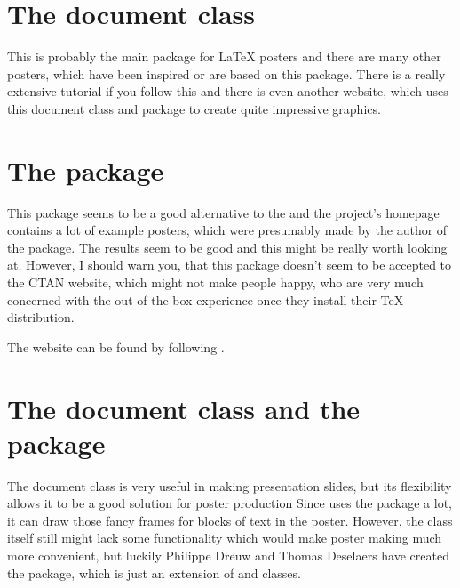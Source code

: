 \documentclass[
]{scrartcl}
\begin{document}
\section{The  document class}

%
This is probably the main package for \LaTeX{} posters and there are many other
    posters, which have been inspired or are based on this package.
%
There is a really extensive tutorial if you follow this 
     and
    there is even another website, which uses this document class and
     package to create quite impressive graphics.

\section{The  package}

%
This package seems to be a good alternative to the  and the
    project's homepage contains a lot of example posters, which were presumably
    made by the author of the package.
%
The results seem to be good and this might be really worth looking at.
%
However, I should warn you, that this package doesn't seem to be accepted to the
    CTAN website, which might not make people happy, who are very much concerned
    with the out-of-the-box experience once they install their \TeX{}
    distribution.

%
The website can be found by following
    .

\section{The  document class and the  package}

%
The  document class is very useful in making presentation slides,
    but its flexibility allows it to be a good solution for poster production
%
Since  uses the  package a lot, it can draw those fancy
    frames for blocks of text in the poster.
%
However, the  class itself still might lack some functionality which
    would make poster making much more convenient, but luckily Philippe Dreuw
    and Thomas Deselaers have created the  package, which is
    just an extension of  and  classes.
\end{document}
